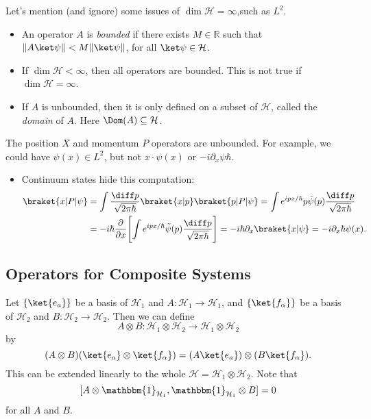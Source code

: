 \documentclass[12pt]{article}
\begin{document}
Let's mention (and ignore) some issues of $\dim \mathcal{H} = \infty$,such as $L^2$.
\begin{itemize}
	\item An operator $A$ is \emph{bounded} if there exists $M \in \mathbb{R}$ such that $\|A \ket \psi\| < M \|\ket \psi\|$, for all $\ket \psi \in \mathcal{H}$.
	\item If $\dim \mathcal{H} < \infty$, then all operators are bounded. This is not true if $\dim \mathcal{H} = \infty$.
	\item If $A$ is unbounded, then it is only defined on a subset of $\mathcal{H}$, called the \emph{domain} of $A$. Here $\Dom(A) \subseteq \mathcal{H}$.
\end{itemize}

The position $X$ and momentum $P$ operators are unbounded. For example, we could have $\psi(x) \in L^2$, but not $x \cdot \psi (x)$ or $-i \partial_x \psi \hbar$.
\begin{itemize}
	\item Continuum states hide this computation:
		\begin{align*}
			\braket{x|P|\psi} &= \int \frac{\diff p}{\sqrt{2 \pi \hbar}} \braket{x|p} \braket{p|P|\psi} = \int e^{ipx/\hbar} p \tilde \psi(p) \frac{\diff p}{\sqrt{2 \pi \hbar}} \\
					  &= -i \hbar \frac{\partial}{\partial x} \Biggl[ \int e^{ipx/\hbar} \tilde \psi(p) \frac{\diff p}{\sqrt{2 \pi \hbar}} \Biggr] = -i \hbar \partial_x \braket{x|\psi} = -i \partial_x \hbar \psi(x).
		\end{align*}
\end{itemize}

\subsection{Operators for Composite Systems}
\label{sub:comp_ops}

Let $\{\ket{e_a}\}$ be a basis of $\mathcal{H}_1$ and $A : \mathcal{H}_1 \to \mathcal{H}_1$, and $\{\ket{f_\alpha}\}$ be a basis of $\mathcal{H}_2$ and $B:\mathcal{H}_2 \to \mathcal{H}_2$. Then we can define
\[
A \otimes B : \mathcal{H}_1 \otimes \mathcal{H}_2 \to \mathcal{H}_1 \otimes \mathcal{H}_2
\]
by
\[
	(A \otimes B)(\ket{e_a} \otimes \ket{f_\alpha}) = (A\ket{e_a}) \otimes (B\ket{f_\alpha}).
\]
This can be extended linearly to the whole $\mathcal{H} = \mathcal{H}_1 \otimes \mathcal{H}_2$. Note that
\[
	[A \otimes \mathbbm{1}_{\mathcal{H}_1}, \mathbbm{1}_{\mathcal{H}_1} \otimes B] = 0
\]
for all $A$ and $B$.
\end{document}
